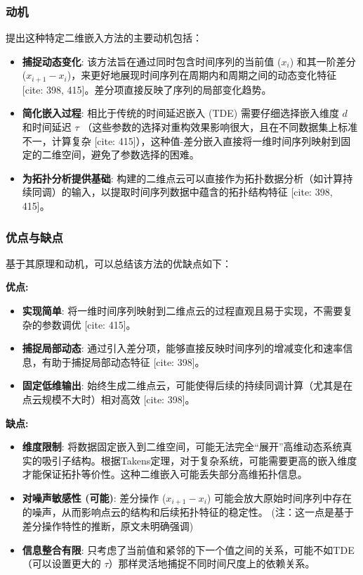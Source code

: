 \subsubsection{动机}
提出这种特定二维嵌入方法的主要动机包括：
\begin{itemize}
    \item \textbf{捕捉动态变化}: 该方法旨在通过同时包含时间序列的当前值 ($x_i$) 和其一阶差分 ($x_{i+1} - x_i$)，来更好地展现时间序列在周期内和周期之间的动态变化特征 [cite: 398, 415]。差分项直接反映了序列的局部变化趋势。
    \item \textbf{简化嵌入过程}: 相比于传统的时间延迟嵌入 (TDE) 需要仔细选择嵌入维度 $d$ 和时间延迟 $\tau$ （这些参数的选择对重构效果影响很大，且在不同数据集上标准不一，计算复杂 [cite: 415]），这种值-差分嵌入直接将一维时间序列映射到固定的二维空间，避免了参数选择的困难。
    \item \textbf{为拓扑分析提供基础}: 构建的二维点云可以直接作为拓扑数据分析（如计算持续同调）的输入，以提取时间序列数据中蕴含的拓扑结构特征 [cite: 398, 415]。
\end{itemize}

\subsubsection{优点与缺点}
基于其原理和动机，可以总结该方法的优缺点如下：

\textbf{优点:}
\begin{itemize}
    \item \textbf{实现简单}: 将一维时间序列映射到二维点云的过程直观且易于实现，不需要复杂的参数调优 [cite: 415]。
    \item \textbf{捕捉局部动态}: 通过引入差分项，能够直接反映时间序列的增减变化和速率信息，有助于捕捉局部动态特征 [cite: 398]。
    \item \textbf{固定低维输出}: 始终生成二维点云，可能使得后续的持续同调计算（尤其是在点云规模不大时）相对高效 [cite: 398]。
\end{itemize}

\textbf{缺点:}
\begin{itemize}
    \item \textbf{维度限制}: 将数据固定嵌入到二维空间，可能无法完全“展开”高维动态系统真实的吸引子结构。根据Takens定理，对于复杂系统，可能需要更高的嵌入维度才能保证拓扑等价性。这种二维嵌入可能丢失部分高维拓扑信息。
    \item \textbf{对噪声敏感性 (可能)}: 差分操作 ($x_{i+1} - x_i$) 可能会放大原始时间序列中存在的噪声，从而影响点云的结构和后续拓扑特征的稳定性。 (注：这一点是基于差分操作特性的推断，原文未明确强调)
    \item \textbf{信息整合有限}: 只考虑了当前值和紧邻的下一个值之间的关系，可能不如TDE（可以设置更大的 $\tau$）那样灵活地捕捉不同时间尺度上的依赖关系。
\end{itemize}

